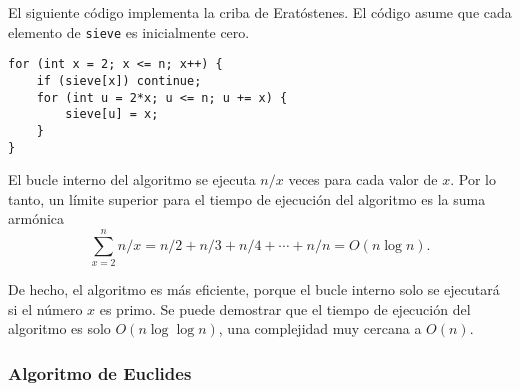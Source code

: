 \begin{center}
\end{center}

El siguiente código implementa la criba de
Eratóstenes.
El código asume que cada elemento de
\texttt{sieve} es inicialmente cero.

\begin{lstlisting}
for (int x = 2; x <= n; x++) {
    if (sieve[x]) continue;
    for (int u = 2*x; u <= n; u += x) {
        sieve[u] = x;
    }
}
\end{lstlisting}

El bucle interno del algoritmo se ejecuta
$n/x$ veces para cada valor de $x$.
Por lo tanto, un límite superior para el tiempo de ejecución
del algoritmo es la suma armónica
\[\sum_{x=2}^n n/x = n/2 + n/3 + n/4 + \cdots + n/n = O(n \log n).\]


De hecho, el algoritmo es más eficiente,
porque el bucle interno solo se ejecutará si
el número $x$ es primo.
Se puede demostrar que el tiempo de ejecución del
algoritmo es solo $O(n \log \log n)$,
una complejidad muy cercana a $O(n)$. 

\subsubsection{Algoritmo de Euclides}

